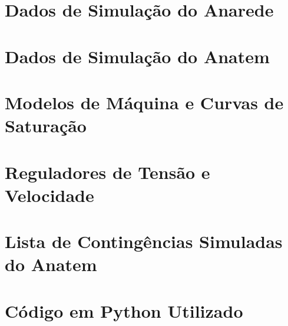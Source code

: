 \documentclass[12pt,oneside,a4paper,chapter=TITLE,section=TITLE,sumario=tradicional,english,brazil]{abntex2}
\begin{document}
\begin{apendicesenv}
	\partapendices
	\chapter{Dados de Simulação do Anarede}
	\par
	
	\par
	\chapter{Dados de Simulação do Anatem}
	\par
	
	\par	
	\chapter{Modelos de Máquina e Curvas de Saturação}
	\par
	
	\par	
	\chapter{Reguladores de Tensão e Velocidade}
	\par
	
	\par	
	\chapter{Lista de Contingências Simuladas do Anatem}
	\par
	
	\par	
	\chapter{Código em Python Utilizado}
	\par
	
	\par	
	
	\par
\end{apendicesenv}
	
	
\end{document}
